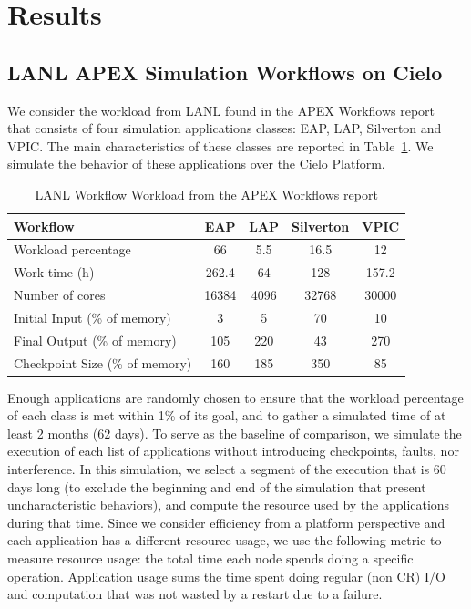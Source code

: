 
\section{Results}\label{sec:results}

\subsection{LANL APEX Simulation Workflows on Cielo}

We consider the workload from LANL found in the APEX Workflows
report~\cite{apex2016} that consists of four simulation applications
classes: EAP, LAP, Silverton and VPIC. The main characteristics of
these classes are reported in Table~\ref{table:lanl}. We simulate the
behavior of these applications over the Cielo Platform. 

\begin{table}
\begin{tabular}{|l|c|c|c|c|}
\hline
 Workflow & EAP & LAP & Silverton & VPIC \\\hline
Workload percentage & 66 & 5.5 & 16.5 & 12 \\\hline
Work time (h) & 262.4 & 64 & 128 & 157.2 \\\hline
Number of cores & 16384 & 4096 & 32768 & 30000 \\\hline
Initial Input (\% of memory) &  3 & 5 & 70 & 10 \\\hline
Final Output (\% of memory) & 105 & 220 & 43 & 270 \\\hline
Checkpoint Size (\% of memory) & 160 & 185 & 350 & 85 \\\hline
\end{tabular}
\caption{LANL Workflow Workload from the APEX Workflows report\label{table:lanl}}
\end{table}

Enough applications are randomly chosen to ensure that the workload
percentage of each class is met within 1\% of its goal, and to gather
a simulated time of at least 2 months (62 days). To serve as the
baseline of comparison, we simulate the execution of each list of
applications without introducing checkpoints, faults, nor
interference. In this simulation, we select a segment of the execution
that is 60 days long (to exclude the beginning and end of the
simulation that present uncharacteristic behaviors), and compute
the resource used by the applications during that time. Since we
consider efficiency from a platform perspective and each application
has a different resource usage, we use the following metric to measure
resource usage: the total time each node spends doing a specific
operation. Application usage sums the time spent doing regular (non CR) I/O
and computation that was not wasted by a restart due to a failure.


